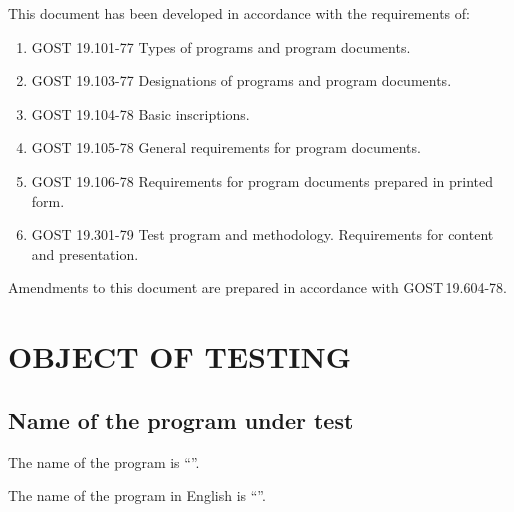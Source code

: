 \documentclass[12pt,a4paper]{extarticle}
\begin{document}
\clearpage

\noindent
This document has been developed in accordance with the requirements of:

\begin{enumerate}[label=\arabic*), leftmargin=1.25cm]
\item GOST 19.101-77 Types of programs and program documents\cite{gost19101}.
\item GOST 19.103-77 Designations of programs and program documents\cite{gost19103}.
\item GOST 19.104-78 Basic inscriptions\cite{gost19104}.
\item GOST 19.105-78 General requirements for program documents\cite{gost19105}.
\item GOST 19.106-78 Requirements for program documents prepared in printed
      form\cite{gost19106}.
\item GOST 19.301-79 Test program and methodology. Requirements for content
      and presentation\cite{gost19301}.
\end{enumerate}

Amendments to this document are prepared in accordance with GOST\,19.604-78\cite{gost19604}.

\clearpage

\hypersetup{linkcolor=black}
\tableofcontents
\hypersetup{linkcolor=blue}
\thispagestyle{fancy}
\clearpage

\section{OBJECT OF TESTING}

\subsection{Name of the program under test}

The name of the program is \enquote{\projectname}.

The name of the program in English is \enquote{\hseProjectNameEn}.
\end{document}
